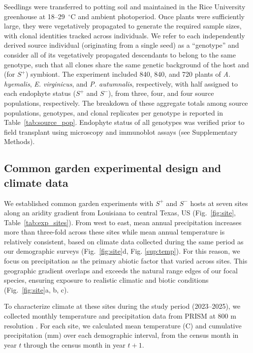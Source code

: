 \documentclass[12pt]{article}\usepackage[]{graphicx}\usepackage[dvipsnames]{xcolor}
\begin{document}
Seedlings were transferred to potting soil and maintained in the Rice University greenhouse at 18--29~$^\circ$C and ambient photoperiod.
Once plants were sufficiently large, they were vegetatively propagated to generate the required sample sizes, with clonal identities tracked across individuals. 
We refer to each independently derived source individual (originating from a single seed) as a ``genotype'' and consider all of its vegetatively propagated descendants to belong to the same genotype, such that all clones share the same genetic background of the host and (for $S^+$) symbiont.
The experiment included 840, 840, and 720 plants of \textit{A. hyemalis}, \textit{E. virginicus}, and \textit{P. autumnalis}, respectively, with half assigned to each endophyte status ($S^+$ and $S^-$), from three, four, and four source populations, respectively.
The breakdown of these aggregate totals among source populations, genotypes, and clonal replicates per genotype is reported in Table~\ref{tab:source_pop}.
Endophyte status of all genotypes was verified prior to field transplant using microscopy and immunoblot assays (see Supplementary Methods).


\subsection*{Common garden experimental design and climate data}
We established common garden experiments with $S^+$ and $S^-$ hosts at seven sites along an aridity gradient from Louisiana to central Texas, US (Fig.~\ref{fig:site}, Table~\ref{tab:exp_sites}).
From west to east, mean annual precipitation increases more than three-fold across these sites while mean annual temperature is relatively consistent, based on climate data collected during the same period as our demographic surveys (Fig.~\ref{fig:site}d, Fig. \ref{sup:temp}).
For this reason, we focus on precipitation as the primary abiotic factor that varied across sites.  
This geographic gradient overlaps and exceeds the natural range edges of our focal species, ensuring exposure to realistic climatic and biotic conditions (Fig.~\ref{fig:site}a, b, c). 

To characterize climate at these sites during the study period (2023–2025), we collected monthly temperature and precipitation data from PRISM at 800 m resolution \citep{PRISM2024}. 
For each site, we calculated mean temperature (\textdegree C) and cumulative precipitation (mm) over each demographic interval, from the census month in year $t$ through the census month in year $t+1$.
\end{document}

